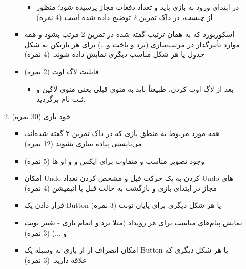 \documentclass[]{article}
\begin{document}
\begin{itemize}[label = {$\blacksquare$}]
\begin{enumerate}
\begin{itemize}[label = $\circ$]
\begin{itemize}[label = $\Leftarrow$]
\item
در ابتدای ورود به بازی باید  و تعداد دفعات مجاز  پرسیده شود؛ منظور از  چیست، در داک تمرین 2 توضیح داده شده است (4 نمره)
\end{itemize}



\item
اسکوربورد که به همان ترتیب گفته شده در تمرین 2 مرتب بشود و همه موارد تأثیرگذار در مرتب‌سازی (برد و باخت و...) برای هر بازیکن به شکل جدول یا هر شکل مناسب دیگری نمایش داده شوند. (4 نمره)

\item
قابلیت لاگ اوت (2 نمره)

\begin{itemize}[label = $\Leftarrow$]
\item
بعد از لاگ اوت کردن، طبیعتاً باید به منوی قبلی یعنی منوی لاگین و ثبت نام برگردید.
\end{itemize}

\end{itemize}

\item
خود بازی (30 نمره)

\begin{itemize}[label = $\circ$]

\item
همه مورد مربوط به منطق بازی که در داک تمرین ۲ گفته شده‌اند، می‌بایستی پیاده سازی بشوند (12 نمره)

\item
وجود تصویر مناسب و متفاوت برای ایکس و و او ها (5 نمره)

\item
امکان Undo کردن به یک حرکت قبل و مشخص کردن تعداد Undo های مجاز در ابتدای بازی و بازگشت به حالت قبل با انیمیشن (4 نمره)

\item
قرار دادن یک Button یا هر شکل دیگری برای پایان نوبت  (3 نمره)

\item
نمایش پیام‌های مناسب برای هر رویداد (مثلا برد و اتمام بازی - تغییر نوبت و ...)  (3 نمره)
\item
 امکان انصراف از از بازی به وسیله یک Button یا هر شکل دیگری که علاقه دارید. (3 نمره)


\end{itemize}

\end{enumerate}



\end{itemize}
\end{document}
